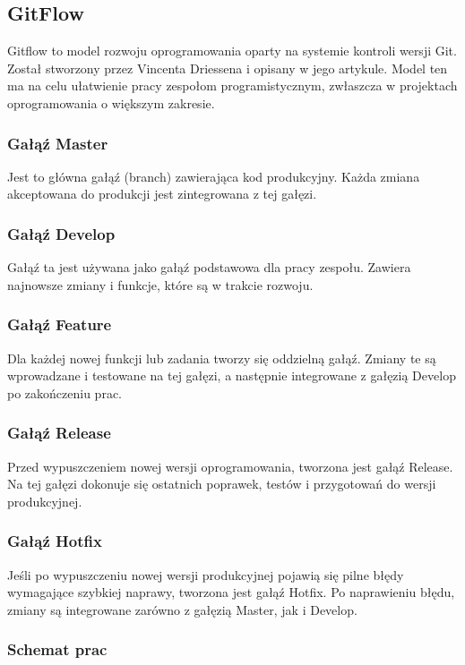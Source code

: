 \documentclass[a4paper,12pt]{article}
\begin{document}
\newpage
\clearpage

\subsection{GitFlow}
Gitflow to model rozwoju oprogramowania oparty na systemie kontroli wersji Git. Został stworzony przez Vincenta Driessena i opisany w jego artykule. Model ten ma na celu ułatwienie pracy zespołom programistycznym, zwłaszcza w projektach oprogramowania o większym zakresie.
\subsubsection{Gałąź Master}
Jest to główna gałąź (branch) zawierająca kod produkcyjny. Każda zmiana akceptowana do produkcji jest zintegrowana z tej gałęzi.
\subsubsection{Gałąź Develop}
Gałąź ta jest używana jako gałąź podstawowa dla pracy zespołu. Zawiera najnowsze zmiany i funkcje, które są w trakcie rozwoju.
\subsubsection{Gałąź Feature}
Dla każdej nowej funkcji lub zadania tworzy się oddzielną gałąź. Zmiany te są wprowadzane i testowane na tej gałęzi, a następnie integrowane z gałęzią Develop po zakończeniu prac.
\subsubsection{Gałąź Release}
Przed wypuszczeniem nowej wersji oprogramowania, tworzona jest gałąź Release. Na tej gałęzi dokonuje się ostatnich poprawek, testów i przygotowań do wersji produkcyjnej.
\subsubsection{Gałąź Hotfix}
Jeśli po wypuszczeniu nowej wersji produkcyjnej pojawią się pilne błędy wymagające szybkiej naprawy, tworzona jest gałąź Hotfix. Po naprawieniu błędu, zmiany są integrowane zarówno z gałęzią Master, jak i Develop.

\subsubsection{Schemat prac}
\end{document}
